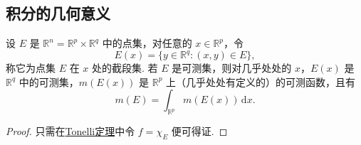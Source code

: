 \documentclass[../../main.tex]{subfiles}%
\begin{document}
\subsection{积分的几何意义}

\begin{theorem}
设 \( E \) 是 \( \mathbb{R}^n = \mathbb{R}^p \times \mathbb{R}^q \) 中的点集，对任意的 \( x \in \mathbb{R}^p \)，令
\[
E(x) = \{ y \in \mathbb{R}^q : (x, y) \in E \},
\]
称它为点集 \( E \) 在 \( x \) 处的截段集. 若 \( E \) 是可测集，则对几乎处处的 \( x \)，\( E(x) \) 是 \( \mathbb{R}^q \) 中的可测集，\( m(E(x)) \) 是 \( \mathbb{R}^p \) 上（几乎处处有定义的）的可测函数，且有
\[
m(E) = \int_{\mathbb{R}^p} m(E(x)) \, \mathrm{d}x.
\]
\end{theorem}
\begin{proof}

只需在\hyperref[theorem:Tonelli 定理 非负可测函数的情形]{Tonelli定理}中令 \( f = \chi_E \) 便可得证.

\end{proof}
\end{document}

